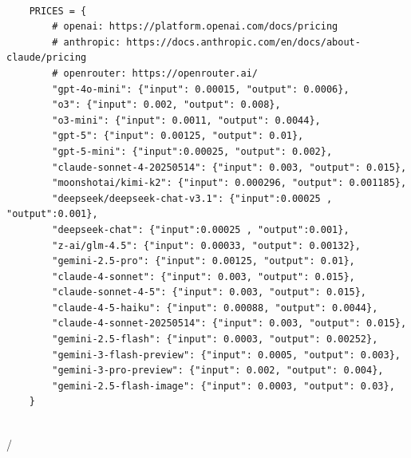 

\begin{tcolorbox}[title={\textbf{\small Cost Table }}, boxrule=1pt, arc=0mm, colback=black!5!white, colframe=black!75!white, breakable, before skip=10pt, after skip=10pt, pad at break=2mm, parbox=false]
\begin{verbatim}

    PRICES = {
        # openai: https://platform.openai.com/docs/pricing
        # anthropic: https://docs.anthropic.com/en/docs/about-claude/pricing
        # openrouter: https://openrouter.ai/
        "gpt-4o-mini": {"input": 0.00015, "output": 0.0006},
        "o3": {"input": 0.002, "output": 0.008},
        "o3-mini": {"input": 0.0011, "output": 0.0044},
        "gpt-5": {"input": 0.00125, "output": 0.01},
        "gpt-5-mini": {"input":0.00025, "output": 0.002},
        "claude-sonnet-4-20250514": {"input": 0.003, "output": 0.015},
        "moonshotai/kimi-k2": {"input": 0.000296, "output": 0.001185}, 
        "deepseek/deepseek-chat-v3.1": {"input":0.00025 , "output":0.001},
        "deepseek-chat": {"input":0.00025 , "output":0.001},
        "z-ai/glm-4.5": {"input": 0.00033, "output": 0.00132},
        "gemini-2.5-pro": {"input": 0.00125, "output": 0.01},
        "claude-4-sonnet": {"input": 0.003, "output": 0.015},
        "claude-sonnet-4-5": {"input": 0.003, "output": 0.015},
        "claude-4-5-haiku": {"input": 0.00088, "output": 0.0044},
        "claude-4-sonnet-20250514": {"input": 0.003, "output": 0.015},
        "gemini-2.5-flash": {"input": 0.0003, "output": 0.00252},
        "gemini-3-flash-preview": {"input": 0.0005, "output": 0.003},
        "gemini-3-pro-preview": {"input": 0.002, "output": 0.004},
        "gemini-2.5-flash-image": {"input": 0.0003, "output": 0.03},
    }


\end{verbatim}
/\end{tcolorbox}